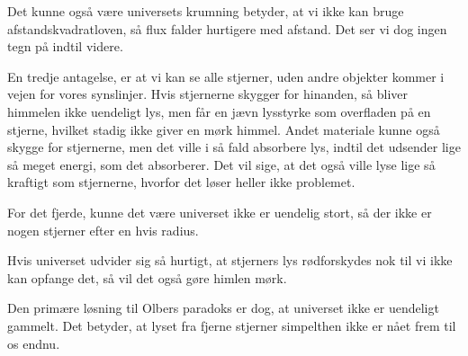 Det kunne også være universets krumning betyder, at vi ikke kan bruge afstandskvadratloven, så flux falder hurtigere med afstand. Det ser vi dog ingen tegn på indtil videre.

En tredje antagelse, er at vi kan se alle stjerner, uden andre objekter kommer i vejen for vores synslinjer. Hvis stjernerne skygger for hinanden, så bliver himmelen ikke uendeligt lys, men får en jævn lysstyrke som overfladen på en stjerne, hvilket stadig ikke giver en mørk himmel. Andet materiale kunne også skygge for stjernerne, men det ville i så fald absorbere lys, indtil det udsender lige så meget energi, som det absorberer. Det vil sige, at det også ville lyse lige så kraftigt som stjernerne, hvorfor det løser heller ikke problemet.

For det fjerde, kunne det være universet ikke er uendelig stort, så der ikke er nogen stjerner efter en hvis radius.

Hvis universet udvider sig så hurtigt, at stjerners lys rødforskydes nok til vi ikke kan opfange det, så vil det også gøre himlen mørk. 

Den primære løsning til Olbers paradoks er dog, at universet ikke er uendeligt gammelt. Det betyder, at lyset fra fjerne stjerner simpelthen ikke er nået frem til os endnu.




